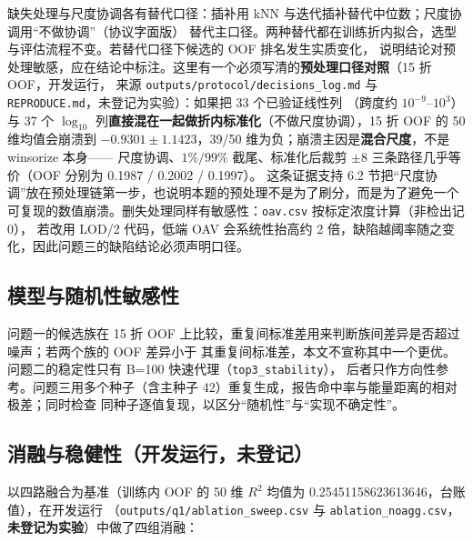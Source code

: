 \documentclass[
  a4paper,12pt]{article}
\begin{document}
缺失处理与尺度协调各有替代口径：插补用 kNN
与迭代插补替代中位数；尺度协调用``不做协调''（协议字面版）
替代主口径。两种替代都在训练折内拟合，选型与评估流程不变。若替代口径下候选的
OOF 排名发生实质变化，
说明结论对预处理敏感，应在结论中标注。这里有一个必须写清的\textbf{预处理口径对照}（15
折 OOF，开发运行， 来源 \texttt{outputs/protocol/decisions\_log.md} 与
\texttt{REPRODUCE.md}，未登记为实验）：如果把 33 个已验证线性列 （跨度约
\(10^{-9}\)--\(10^{3}\)）与 37 个 \(\log_{10}\)
列\textbf{直接混在一起做折内标准化}（不做尺度协调），15 折 OOF 的 50
维均值会崩溃到 \textbf{\(-0.9301\pm1.1423\)}，39/50
维为负；崩溃主因是\textbf{混合尺度}，不是 winsorize 本身------
尺度协调、\(1\%/99\%\) 截尾、标准化后裁剪 \(\pm8\) 三条路径几乎等价（OOF
分别为 0.1987 / 0.2002 / 0.1997）。 这条证据支持 6.2
节把``尺度协调''放在预处理链第一步，也说明本题的预处理不是为了刷分，而是为了避免一个
可复现的数值崩溃。删失处理同样有敏感性：\texttt{oav.csv}
按标定浓度计算（非检出记 0）， 若改用 LOD/2 代码，低端 OAV
会系统性抬高约 2
倍，缺陷越阈率随之变化，因此问题三的缺陷结论必须声明口径。

\subsection{模型与随机性敏感性}\label{ux6a21ux578bux4e0eux968fux673aux6027ux654fux611fux6027}

问题一的候选族在 15 折 OOF
上比较，重复间标准差用来判断族间差异是否超过噪声；若两个族的 OOF
差异小于 其重复间标准差，本文不宣称其中一个更优。问题二的稳定性只有
B=100 快速代理（\texttt{top3\_stability}），
后者只作方向性参考。问题三用多个种子（含主种子
42）重复生成，报告命中率与能量距离的相对极差；同时检查
同种子逐值复现，以区分``随机性''与``实现不确定性''。

\subsection{消融与稳健性（开发运行，未登记）}\label{ux6d88ux878dux4e0eux7a33ux5065ux6027ux5f00ux53d1ux8fd0ux884cux672aux767bux8bb0}

以四路融合为基准（训练内 OOF 的 50 维 \(R^2\) 均值为
0.25451158623613646，台账值），在开发运行
（\texttt{outputs/q1/ablation\_sweep.csv} 与
\texttt{ablation\_noagg.csv}，\textbf{未登记为实验}）中做了四组消融：
\end{document}
